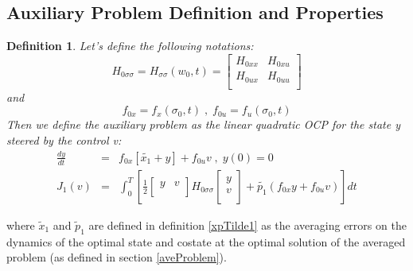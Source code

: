 \documentclass[a4paper,10pt]{article}
\newtheorem{definition}{Definition}
\begin{document}
\subsection{Auxiliary Problem Definition and Properties}\label{AuxProblemStatement}
\begin{definition}\label{secondVariation}
         Let's define the following notations:
   \[
       H_{0 \sigma \sigma} = H_{\sigma \sigma} (w_{0},t) 
       = 
       \left[\begin{array}
       {cc}
           
           H_{0xx} & H_{0xu}  \\
           
           H_{0ux} &  H_{0uu}   \\         
            
       \end{array}\right]
   \]
  and
    \[
        f_{0x}=f_{x}(\sigma_{0},t) \; , \; f_{0u}=f_{u}(\sigma_{0},t)
    \]
    Then we define the auxiliary problem as the linear quadratic OCP 
    for the state y steered by the control v:
    \begin{eqnarray}
        \frac{dy}{dt} & = & f_{0x}[\tilde{x_{1}}+y] + f_{0u}v \; , \; 
	y(0)=0
        \label{auxstate}\\
        J_{1}(v) & = & \int_{0}^{T} \left[\frac{1}{2} \left[
        \begin{array}
        {cc}
            
            y & v  \\
             
        \end{array}
        \right]
	H_{0 \sigma \sigma} \left[
	\begin{array}
	{c}
	    
	    y  \\
	    
	    v  \\
	    
	\end{array}
	\right]
	+ \tilde{p_{1}} \left(f_{0x}y + f_{0u}v\right)
	\right]dt
        \label{auxcost}
    \end{eqnarray}
\end{definition}
where $\tilde{x}_{1}$ and $\tilde{p}_{1}$ are defined in definition 
\ref{xpTilde1} as the averaging errors on the dynamics of the optimal 
state and costate at the optimal solution of the averaged problem 
(as defined in section \ref{aveProblem}).
\end{document}
